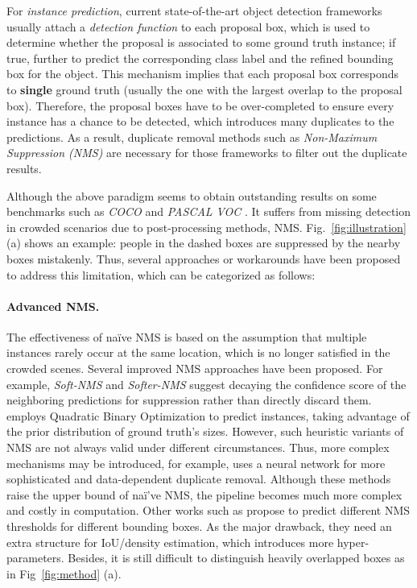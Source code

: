 \documentclass[10pt,twocolumn,letterpaper]{article}
\begin{document}
For \emph{instance prediction}, current state-of-the-art object detection frameworks~\cite{ren2015faster,lin2017feature,lin2017focal,liu2016ssd,yolov3} usually attach a \emph{detection function} to each proposal box, which is used to determine whether the proposal is associated to some ground truth instance; if true, further to predict the corresponding class label and the refined bounding box for the object. This mechanism implies that each proposal box corresponds to \textbf{single} ground truth (usually the one with the largest overlap to the proposal box). Therefore, the proposal boxes have to be over-completed to ensure every instance has a chance to be detected, which introduces many duplicates to the predictions. As a result, duplicate removal methods such as \emph{Non-Maximum Suppression (NMS)} are necessary for those frameworks to filter out the duplicate results.

Although the above paradigm seems to obtain outstanding results on some benchmarks such as \emph{COCO} \cite{lin2014microsoft} and \emph{PASCAL VOC} \cite{pascalvoc}.  It suffers from missing detection in crowded scenarios due to post-processing methods, \eg NMS. Fig.~\ref{fig:illustration} (a) shows an example: people in the dashed boxes are suppressed by the nearby boxes mistakenly. Thus, several approaches or workarounds have been proposed to address this limitation, which can be categorized as follows:

\paragraph{Advanced NMS.}
The effectiveness of na\"ive NMS is based on the assumption that multiple instances rarely occur at the same location, which is no longer satisfied in the crowded scenes. Several improved NMS approaches have been proposed. For example, \emph{Soft-NMS} \cite{softnms} and \emph{Softer-NMS} \cite{he2019bounding} suggest decaying the confidence score of the neighboring predictions for suppression rather than directly discard them. \cite{optimizedpedestrian} employs Quadratic Binary Optimization to predict instances, taking advantage of the prior distribution of ground truth's sizes. However, such heuristic variants of NMS are not always valid under different circumstances.  Thus, more complex mechanisms may be introduced, for example, \cite{learningnms,sequentialcontext} uses a neural network for more sophisticated and data-dependent duplicate removal. Although these methods raise the upper bound of na\"i've NMS, the pipeline becomes much more complex and costly in computation. Other works such as \cite{adaptiveNMS,hosang2016convnet} propose to predict different NMS thresholds for different bounding boxes. As the major drawback, they need an extra structure for IoU/density estimation, which introduces more hyper-parameters. Besides, it is still difficult to distinguish heavily overlapped boxes as in Fig~\ref{fig:method} (a).
\end{document}
